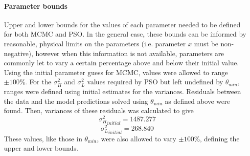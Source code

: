 \paragraph{Parameter bounds} \label{param_bounds}
Upper and lower bounds for the values of each parameter needed to be defined for both MCMC and PSO. In the general case, these bounds can be informed by reasonable, physical limits on the parameters (i.e. parameter $x$ must be non-negative), however when this information is not available, parameters are commonly let to vary a certain percentage above and below their initial value. Using the initial parameter guess for MCMC, values were allowed to range $\pm 100\%$. For the $\sigma_{H}^{2}$ and $\sigma_{L}^{2}$ values required by PSO but left undefined by $\theta_{min}$, ranges were defined using initial estimates for the variances. Residuals between the data and the model predictions solved using $\theta_{min}$ as defined above were found. Then, variances of these residuals was calculated to give
$${\sigma_{H}^{2}}_{initial} = 1487.277$$
$${\sigma_{L}^{2}}_{initial}  = 268.840$$
These values, like those in $\theta_{min}$, were also allowed to vary $\pm 100\%$, defining the upper and lower bounds.

